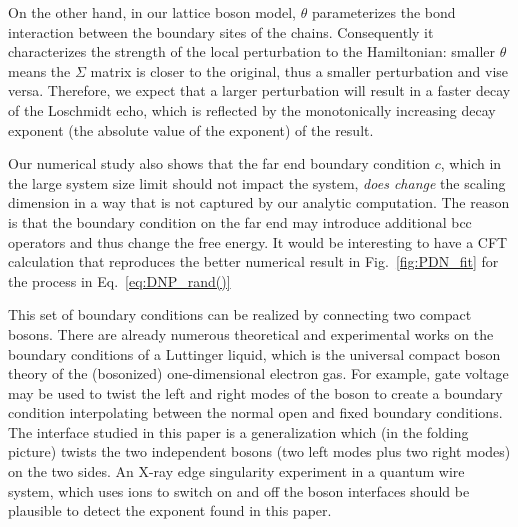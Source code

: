 On the other hand, in our lattice boson model, $\theta$ parameterizes the bond interaction between the boundary sites of the chains. Consequently it characterizes the strength of the local perturbation to the Hamiltonian: smaller $\theta$ means the $\Sigma$ matrix is closer to the original, thus a smaller perturbation and vise versa. Therefore, we expect that a larger perturbation will result in a faster decay of the Loschmidt echo, which is reflected by the monotonically increasing decay exponent (the absolute value of the exponent) of the result.

Our numerical study also shows that the far end boundary condition $c$, which in the large system size limit should not impact the system, {\it does change} the scaling dimension in a way that is not captured by our analytic computation. The reason is that the boundary condition on the far end may introduce additional bcc operators and thus change the free energy. It would be interesting to have a CFT calculation that reproduces the better numerical result in Fig.~\ref{fig:PDN_fit} {\color{red}for the process in Eq.~\eqref{eq:DNP_rand()}}


This set of boundary conditions can be realized by connecting two compact bosons. There are already numerous theoretical and experimental works on the boundary conditions of a Luttinger liquid\cite{schmeltzer_zero_1999,anfuso_luttinger_2003,voit_bounded_2000,fabrizio_interacting_1995,egger_applying_1998}, which is the universal compact boson theory of the (bosonized) one-dimensional electron gas\cite{giamarchi_quantum_2015}. For example, gate voltage \cite{egger_applying_1998} may be used to twist the left and right modes of the boson to create a boundary condition interpolating between the normal open and fixed boundary conditions. The interface studied in this paper is a generalization which (in the folding picture) twists the two independent bosons (two left modes plus two right modes) on the two sides. An X-ray edge singularity experiment in a quantum wire system, which uses ions to switch on and off the boson interfaces should be plausible to detect the exponent found in this paper. 


